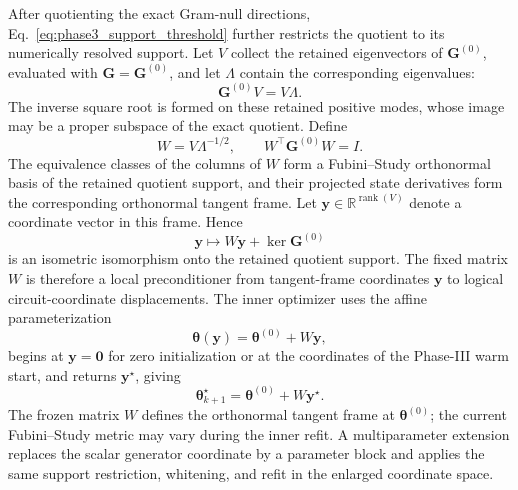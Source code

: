 \documentclass[
  reprint,
  amsmath,
  amssymb,
  aps,
  pra,
  nofootinbib,
  superscriptaddress,
  floatfix
]{revtex4-2}
\begin{document}
After quotienting the exact Gram-null directions,
Eq.~\eqref{eq:phase3_support_threshold} further restricts the quotient to its
numerically resolved support. Let \(V\) collect the retained eigenvectors of
\(\mathbf G^{(0)}\), evaluated with \(\mathbf G=\mathbf G^{(0)}\), and let
\(\Lambda\) contain the corresponding eigenvalues:
\[
\mathbf G^{(0)}V=V\Lambda.
\]
The inverse square root is formed on these retained positive modes, whose
image may be a proper subspace of the exact quotient. Define
\begin{equation}
W=V\Lambda^{-1/2},
\qquad
W^{\top}\mathbf G^{(0)}W=I.
\label{eq:accepted_refit_whitening}
\end{equation}
The equivalence classes of the columns of \(W\) form a Fubini--Study
orthonormal basis of the retained quotient support, and their projected state
derivatives form the corresponding orthonormal tangent frame. Let
\(\mathbf y\in\mathbb R^{\operatorname{rank}(V)}\) denote a coordinate vector
in this frame. Hence
\[
\mathbf y
\longmapsto
W\mathbf y+\ker\mathbf G^{(0)}
\]
is an isometric isomorphism onto the retained quotient support. The fixed
matrix \(W\) is therefore a local preconditioner from tangent-frame
coordinates \(\mathbf y\) to logical circuit-coordinate displacements. The
inner optimizer uses the affine parameterization
\[
\boldsymbol\theta(\mathbf y)
=
\boldsymbol\theta^{(0)}+W\mathbf y,
\]
begins at \(\mathbf y=\mathbf0\) for zero initialization or at the coordinates
of the Phase-III warm start, and returns \(\mathbf y^\star\), giving
\begin{equation}
\boldsymbol\theta_{k+1}^{\star}
=
\boldsymbol\theta^{(0)}+W\mathbf y^\star.
\label{eq:accepted_refit_endpoint}
\end{equation}
The frozen matrix \(W\) defines the orthonormal tangent frame at
\(\boldsymbol\theta^{(0)}\); the current Fubini--Study metric may vary during
the inner refit. A multiparameter extension replaces the scalar generator
coordinate by a parameter block and applies the same support restriction,
whitening, and refit in the enlarged coordinate space.
\end{document}
